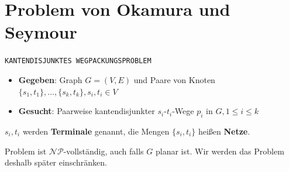 \section{Problem von Okamura und Seymour}

\texttt{KANTENDISJUNKTES WEGPACKUNGSPROBLEM}
\begin{itemize}
	\item \textbf{Gegeben}: Graph $G=(V,E)$ und Paare von Knoten $\{s_1,t_1\},\ldots,\{s_k,t_k\}, s_i,t_i\in V$
	\item \textbf{Gesucht}: Paarweise kantendisjunkter $s_i$-$t_i$-Wege $p_i$ in $G, 1 \leq i \leq k$
\end{itemize}
$s_i,t_i$ werden \textbf{Terminale} genannt, die Mengen $\{s_i,t_i\}$ heißen \textbf{Netze}.

Problem ist $\mathcal{NP}$-vollständig, auch falls $G$ planar ist. Wir werden das Problem deshalb später einschränken.\\

